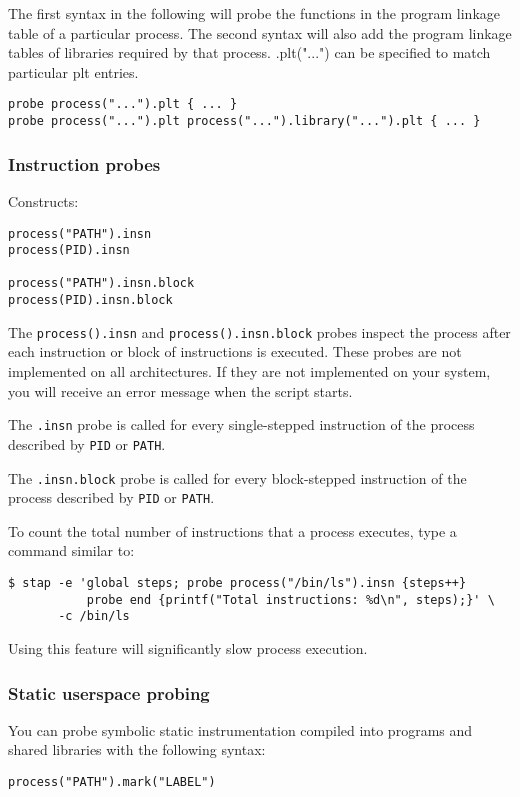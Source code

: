 \documentclass[twoside,english]{article}
\newenvironment{vindent}
{\begin{list}{}{\setlength{\listparindent}{6pt}}
\item[]}
{\end{list}}
\begin{document}
The first syntax in the following will probe the functions in the program
linkage table of a particular process.  The second syntax will also add the
program linkage tables of libraries required by that process.  .plt("...") can
be specified to match particular plt entries.
\begin{vindent}
\begin{verbatim}
probe process("...").plt { ... }
probe process("...").plt process("...").library("...").plt { ... }
\end{verbatim}
\end{vindent}

\subsubsection{Instruction probes}
\label{sec:insnprobes}
Constructs:
\begin{vindent}
\begin{verbatim}
process("PATH").insn
process(PID).insn

process("PATH").insn.block
process(PID).insn.block
\end{verbatim}
\end{vindent}
The \texttt{process().insn} and \texttt{process().insn.block} probes
inspect the process after each instruction or block of instructions is
executed. These probes are not implemented on all architectures. If
they are not implemented on your system, you will receive an error
message when the script starts.

The \texttt{.insn} probe is called for every single-stepped
instruction of the process described by \texttt{PID} or \texttt{PATH}.

The \texttt{.insn.block} probe is called for every block-stepped
instruction of the process described by \texttt{PID} or \texttt{PATH}.

To count the total number of instructions that a process executes,
type a command similar to:
\begin{vindent}
\begin{verbatim}
$ stap -e 'global steps; probe process("/bin/ls").insn {steps++}
           probe end {printf("Total instructions: %d\n", steps);}' \
       -c /bin/ls
\end{verbatim}
\end{vindent}

Using this feature will significantly slow process execution.

\subsubsection{Static userspace probing}
\label{sec:staticuserspace}
You can probe symbolic static instrumentation compiled into programs
and shared libraries with the following syntax:
\begin{vindent}
\begin{verbatim}
process("PATH").mark("LABEL")
\end{verbatim}
\end{vindent}
\end{document}
